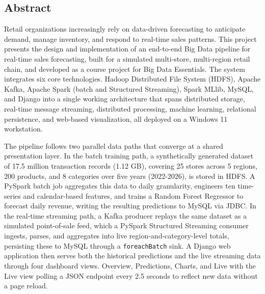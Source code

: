 \documentclass[11pt]{article}
\begin{document}
\tableofcontents
\thispagestyle{plain}
\newpage
\thispagestyle{plain}
\begin{center}
{\section{\large\bfseries\color{navy} Abstract}}
\end{center}

\noindent
Retail organizations increasingly rely on data-driven forecasting to anticipate demand, manage inventory, and respond to real-time sales patterns. This project presents the design and implementation of an end-to-end Big Data pipeline for real-time sales forecasting, built for a simulated multi-store, multi-region retail chain, and developed as a course project for Big Data Essentials. The system integrates six core technologies. Hadoop Distributed File System (HDFS), Apache Kafka, Apache Spark (batch and Structured Streaming), Spark MLlib, MySQL, and Django into a single working architecture that spans distributed storage, real-time message streaming, distributed processing, machine learning, relational persistence, and web-based visualization, all deployed on a Windows 11 workstation.

\vspace{0.3cm}
\noindent
The pipeline follows two parallel data paths that converge at a shared presentation layer. In the batch training path, a synthetically generated dataset of 17.5 million transaction records (1.12 GB), covering 25 stores across 5 regions, 200 products, and 8 categories over five years (2022-2026), is stored in HDFS. A PySpark batch job aggregates this data to daily granularity, engineers ten time-series and calendar-based features, and trains a Random Forest Regressor to forecast daily revenue, writing the resulting predictions to MySQL via JDBC. In the real-time streaming path, a Kafka producer replays the same dataset as a simulated point-of-sale feed, which a PySpark Structured Streaming consumer ingests, parses, and aggregates into live region-and-category-level totals, persisting these to MySQL through a \texttt{foreachBatch} sink. A Django web application then serves both the historical predictions and the live streaming data through four dashboard views. Overview, Predictions, Charts, and Live with the Live view polling a JSON endpoint every 2.5 seconds to reflect new data without a page reload.
\end{document}
